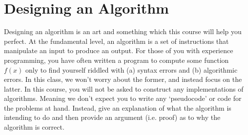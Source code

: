 \documentclass[10pt]{article}
\theoremstyle{plain}
\theoremstyle{definition}
\numberwithin{equation}{section}
\numberwithin{figure}{section}
\begin{document}






\newpage

\section{Designing an Algorithm}

\noindent Designing an algorithm is an art and something which this course will help you perfect. At the fundamental level, an algorithm is a set of instructions that manipulate an input to produce an output. For those of you with experience programming, you have often written a program to compute some function $f(x)$ only to find yourself riddled with (a) syntax errors and (b) algorithmic errors. In this class, we won't worry about the former, and instead focus on the latter. In this course, you will not be asked to construct any implementations of algorithms. Meaning we don't expect you to write any `pseudocode' or code for the problems at hand. Instead, give an explanation of what the algorithm is intending to do and then provide an argument (i.e. proof) as to why the algorithm is correct. \\
\end{document}
